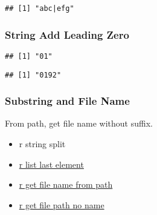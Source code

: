\documentclass[
]{book}
\newenvironment{Shaded}{\begin{snugshade}}{\end{snugshade}}
\newcommand{\CommentTok}[1]{\textcolor[rgb]{0.56,0.35,0.01}{\textit{#1}}}
\newcommand{\DecValTok}[1]{\textcolor[rgb]{0.00,0.00,0.81}{#1}}
\newcommand{\KeywordTok}[1]{\textcolor[rgb]{0.13,0.29,0.53}{\textbf{#1}}}
\newcommand{\NormalTok}[1]{#1}
\newcommand{\StringTok}[1]{\textcolor[rgb]{0.31,0.60,0.02}{#1}}
\providecommand{\tightlist}{%
  \setlength{\itemsep}{0pt}\setlength{\parskip}{0pt}}
\begin{document}
\begin{verbatim}
## [1] "abc|efg"
\end{verbatim}

\hypertarget{string-add-leading-zero}{%
\subsubsection{String Add Leading Zero}\label{string-add-leading-zero}}

\begin{Shaded}
\end{Shaded}

\begin{verbatim}
## [1] "01"
\end{verbatim}

\begin{Shaded}
\end{Shaded}

\begin{verbatim}
## [1] "0192"
\end{verbatim}

\hypertarget{substring-and-file-name}{%
\subsubsection{Substring and File Name}\label{substring-and-file-name}}

From path, get file name without suffix.

\begin{itemize}
\tightlist
\item
  r string split
\item
  \href{https://stackoverflow.com/a/83222/8280804}{r list last element}
\item
  \href{https://stackoverflow.com/a/29114007/8280804}{r get file name from path}
\item
  \href{https://stackoverflow.com/a/47189541/8280804}{r get file path no name}
\end{itemize}
\end{document}

